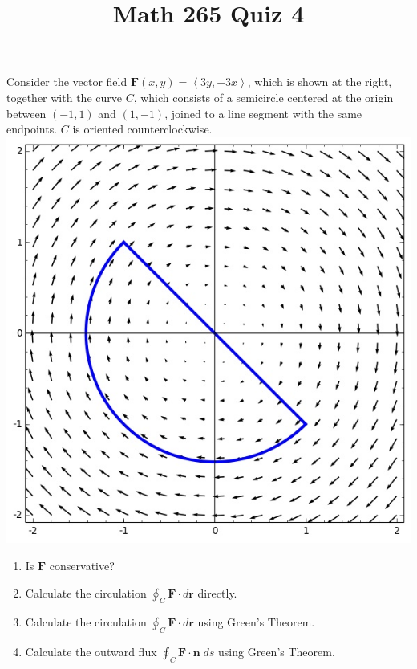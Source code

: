 \documentclass[12pt]{article}
\title{Math 265 Quiz 4}\author{}\date{}
\begin{document}
\maketitle
\thispagestyle{empty}
\begin{multicols}{2}
Consider the vector field $\mathbold{F}\left(x,y\right)
=\left\langle 3y,-3x\right\rangle$, which is shown
at the right, together with the curve $C$,
which consists of a semicircle centered at the origin
between $\left(-1,1\right)$ and $\left(1,-1\right)$,
joined to a line segment with the same endpoints.
$C$ is oriented counterclockwise.
\includegraphics[scale=.6]{Cardioid}
\end{multicols}
\begin{enumerate}
\item Is $\mathbold{F}$ conservative?
\vspace{1in}
\item Calculate the circulation $\oint_C\mathbold{F}
\cdot d\mathbold{r}$ directly.
\vspace{2in}
\item Calculate the circulation $\oint_C\mathbold{F}
\cdot d\mathbold{r}$ using Green's Theorem.
\vspace{4in}
\item Calculate the outward flux $\oint_C\mathbold{F}
\cdot\mathbold{n}\;ds$ using Green's Theorem.
\end{enumerate}
\end{document}
